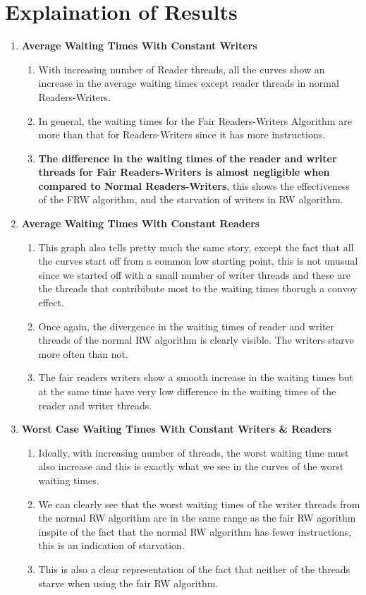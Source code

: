 \documentclass[a4paper,12pt]{report}
\begin{document}
\section{Explaination of Results}
\begin{enumerate}
\item \textbf{Average Waiting Times With Constant Writers}\\
\begin{enumerate}
\item With increasing number of Reader threads, all the curves show an increase in the average waiting times except reader threads in normal Readers-Writers.
\item In general, the waiting times for the Fair Readers-Writers Algorithm are more than that for Readers-Writers since it has more instructions.
\item \textbf{The difference in the waiting times of the reader and writer threads for Fair Readers-Writers is almost negligible when compared to Normal Readers-Writers}, this shows the effectiveness of the FRW algorithm, and the starvation of writers in RW algorithm.
\end{enumerate}
\item \textbf{Average Waiting Times With Constant Readers}\\
\begin{enumerate}
\item This graph also tells pretty much the same story, except the fact that all the curves start off from a common low starting point, this is not unusual since we started off with a small number of writer threads and these are the threads that contribibute most to the waiting times thorugh a convoy effect.
\item Once again, the divergence in the waiting times of reader and writer threads of the normal RW algorithm is clearly visible. The writers starve more often than not.
\item The fair readers writers show a smooth increase in the waiting times but at the same time have very low difference in the waiting times of the reader and writer threads.
\end{enumerate}
\item \textbf{Worst Case Waiting Times With Constant Writers \& Readers}\\
\begin{enumerate}
\item Ideally, with increasing number of threads, the worst waiting time must also increase and this is exactly what we see in the curves of the worst waiting times.
\item We can clearly see that the worst waiting times of the writer threads from the normal RW algorithm are in the same range as the fair RW agorithm inspite of the fact that the normal RW algorithm has fewer instructions, this is an indication of starvation.
\item This is also a clear representation of the fact that neither of the threads starve when using the fair RW algorithm.
\end{enumerate}
\end{enumerate}
\end{document}

